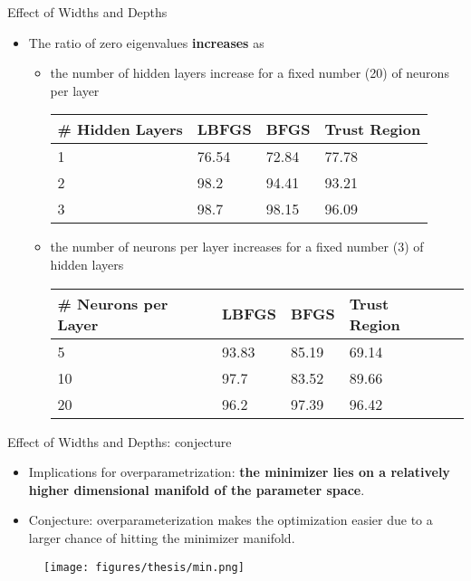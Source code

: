 \documentclass[usenames,dvipsnames]{beamer}
\begin{document}
\begin{frame}{Effect of Widths and Depths}

\begin{itemize}
\item The ratio of zero eigenvalues \textbf{increases} as

\begin{itemize}
\item the number of hidden layers increase for a fixed number (20) of neurons per layer
\begin{center}
\begin{tabular}{@{}llll@{}}
	\toprule
	\# Hidden   Layers &  LBFGS & BFGS  & Trust Region \\ \midrule
	1                         & 76.54 & 72.84 & 77.78        \\
	2                        & 98.2  & 94.41 & 93.21        \\
	3                         & 98.7  & 98.15 & 96.09        \\ \bottomrule
\end{tabular}
\end{center}

\item the number of neurons per layer increases for a fixed number (3) of hidden layers
\begin{center}
	\begin{tabular}{@{}lllll@{}}
		\toprule
		\# Neurons per Layer & LBFGS & BFGS  & Trust Region \\ \midrule
		5                         & 93.83 & 85.19 & 69.14        \\
		10                         & 97.7  & 83.52 & 89.66        \\
		20                        & 96.2  & 97.39 & 96.42        \\ \bottomrule
	\end{tabular}
\end{center}
\end{itemize}
\end{itemize}

\end{frame}


\begin{frame}{Effect of Widths and Depths: conjecture}
\begin{itemize}
\item Implications for overparametrization: \textbf{the minimizer lies on a relatively higher dimensional manifold of the parameter space}.
\item Conjecture: overparameterization makes the optimization easier due to a larger chance of hitting the minimizer manifold.
\end{itemize}

	\begin{figure}[htbp]
	\centering
	\texttt{[image: figures/thesis/min.png]}
\end{figure}
\end{frame}
\end{document}
